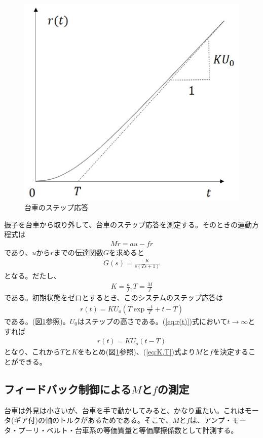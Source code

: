 \documentclass[a4j,11pt,twoside]{ujbook}
\begin{document}
	\begin{figure}[htbp]
		\begin{center}
			\includegraphics[width = 0.6 \linewidth]{step.eps}
			\caption{台車のステップ応答}
			\label{fig:台車のステップ応答}
		\end{center}
	\end{figure}

	振子を台車から取り外して、台車のステップ応答を測定する。そのときの運動方程式は
	\begin{eqnarray*}
		M\ddot{r} = au - fr
	\end{eqnarray*}
	であり、$u$から$r$までの伝達関数$G$を求めると
	\begin{eqnarray*}
		G(s) = \frac{K}{s(Ts+1)}
	\end{eqnarray*}
	となる。だたし、
	\begin{eqnarray}
		K = \frac{a}{f},T = \frac{M}{f}
		\label{eq:K,T}
	\end{eqnarray}
	である。初期状態をゼロとするとき、このシステムのステップ応答は
	\begin{eqnarray}
		r(t) = KU_o(T\exp{\frac{-t}{T}}+t-T)
		\label{eq:r(t)}
	\end{eqnarray}
	である。(図\ref{fig:台車のステップ応答}参照)。$U_0$はステップの高さである。(\ref{eq:r(t)})式において$t→∞$とすれば
	\begin{eqnarray}
		r(t) = KU_o(t-T)
	\end{eqnarray}
	となり、これから$T$と$K$をもとめ(図\ref{fig:台車のステップ応答}参照)、(\ref{eq:K,T})式より$M$と$f$を決定することができる。

	\subsection{フィードバック制御による$M$と$f$の測定}
	台車は外見は小さいが、台車を手で動かしてみると、かなり重たい。これはモータ(ギア付)の軸のトルクがあるためである。そこで、$M$と$f$は、アンプ・モータ・プーリ・ベルト・台車系の等価質量と等価摩擦係数として計測する。
\end{document}
